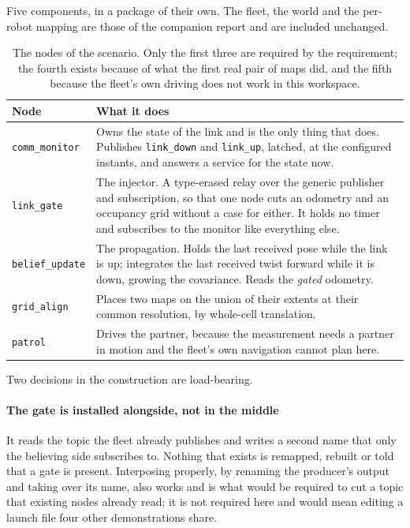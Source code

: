 \documentclass[11pt,a4paper]{article}
\theoremstyle{definition}
\newcommand{\code}[1]{\texttt{\small #1}}
\begin{document}
Five components, in a package of their own. The fleet, the world and the
per-robot mapping are those of the companion report and are included unchanged.

\begin{table}[H]
\centering\small
\caption{The nodes of the scenario. Only the first three are required by the
requirement; the fourth exists because of what the first real pair of maps
did, and the fifth because the fleet's own driving does not work in this
workspace.}
\label{tab:nodes}
\begin{tabularx}{\textwidth}{@{}lX@{}}
\toprule
\textbf{Node} & \textbf{What it does} \\
\midrule
\code{comm\_monitor} &
Owns the state of the link and is the only thing that does. Publishes
\code{link\_down} and \code{link\_up}, latched, at the configured instants, and
answers a service for the state now. \\
\addlinespace
\code{link\_gate} &
The injector. A type-erased relay over the generic publisher and subscription,
so that one node cuts an odometry and an occupancy grid without a case for
either. It holds no timer and subscribes to the monitor like everything else. \\
\addlinespace
\code{belief\_update} &
The propagation. Holds the last received pose while the link is up; integrates
the last received twist forward while it is down, growing the covariance. Reads
the \emph{gated} odometry. \\
\addlinespace
\code{grid\_align} &
Places two maps on the union of their extents at their common resolution, by
whole-cell translation. \\
\addlinespace
\code{patrol} &
Drives the partner, because the measurement needs a partner in motion and the
fleet's own navigation cannot plan here. \\
\bottomrule
\end{tabularx}
\end{table}

Two decisions in the construction are load-bearing.

\paragraph{The gate is installed alongside, not in the middle} It reads the
topic the fleet already publishes and writes a second name that only the
believing side subscribes to. Nothing that exists is remapped, rebuilt or told
that a gate is present. Interposing properly, by renaming the producer's output
and taking over its name, also works and is what would be required to cut a
topic that existing nodes already read; it is not required here and would mean
editing a launch file four other demonstrations share.
\end{document}

